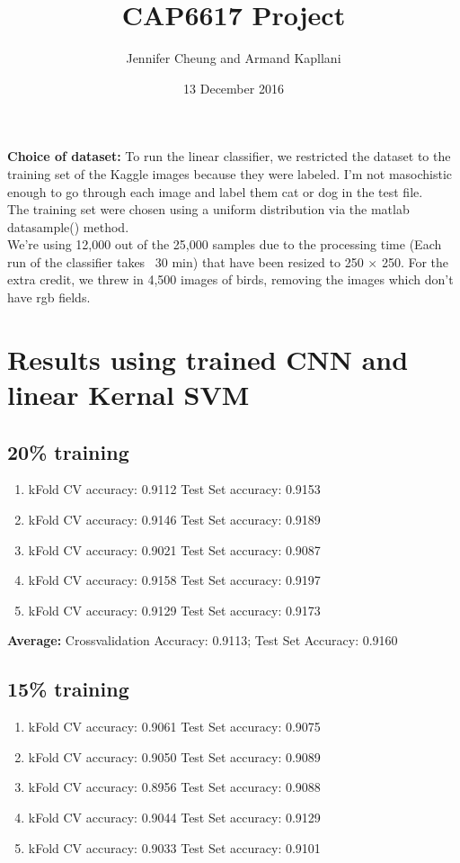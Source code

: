 \documentclass{article}
\title{CAP6617 Project}
\date{13 December 2016}
\author{Jennifer Cheung and Armand Kapllani}
\begin{document}
	\maketitle
	\textbf{Choice of dataset:}  To run the linear classifier, we restricted the dataset to the training set of the Kaggle images because they were labeled. I'm not masochistic enough to go through each image and label them cat or dog in the test file. \\
	The training set were chosen using a uniform distribution via the matlab datasample() method. \\  
	We're using 12,000 out of the 25,000 samples due to the processing time (Each run of the classifier takes ~30 min) that have been resized to 250 $\times$ 250.  For the extra credit, we threw in 4,500 images of birds, removing the images which don't have rgb fields.

	\section{Results using trained CNN and linear Kernal SVM}
	\subsection{20\% training}
	\begin{enumerate}
		\item kFold CV accuracy: 0.9112  \indent Test Set accuracy: 0.9153
		\item kFold CV accuracy: 0.9146  \indent Test Set accuracy: 0.9189
		\item kFold CV accuracy: 0.9021  \indent Test Set accuracy: 0.9087
		\item kFold CV accuracy: 0.9158  \indent Test Set accuracy: 0.9197
		\item kFold CV accuracy: 0.9129  \indent Test Set accuracy: 0.9173
	\end{enumerate}

	\textbf{Average:} Crossvalidation Accuracy: 0.9113;  Test Set Accuracy: 0.9160

	\subsection{15\% training}
	\begin{enumerate}
		\item kFold CV accuracy: 0.9061  \indent Test Set accuracy: 0.9075
		\item kFold CV accuracy: 0.9050  \indent Test Set accuracy: 0.9089
		\item kFold CV accuracy: 0.8956  \indent Test Set accuracy: 0.9088
		\item kFold CV accuracy: 0.9044  \indent Test Set accuracy: 0.9129
		\item kFold CV accuracy: 0.9033  \indent Test Set accuracy: 0.9101
	\end{enumerate}
\end{document}
